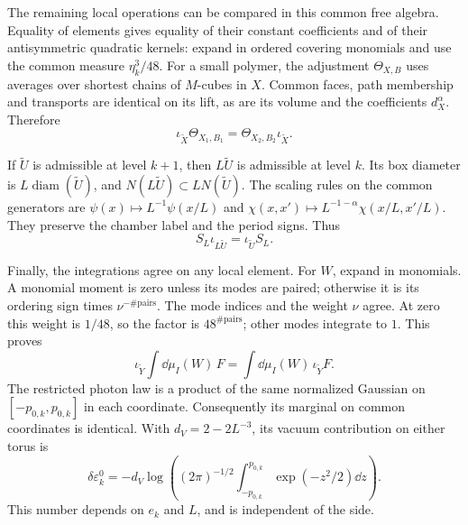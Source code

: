 The remaining local operations can be compared in
this common free algebra. Equality of elements gives
equality of their constant coefficients and of their
antisymmetric quadratic kernels: expand in ordered
covering monomials and use the common measure
$\eta_k^3/48$. For a small polymer, the adjustment
$\Theta_{X,B}$ uses averages over shortest chains
of $M$-cubes in $X$. Common faces, path membership
and transports are identical on its lift, as are
its volume and the coefficients $d_X^\alpha$.
Therefore
\begin{equation}\label{eq:rgcov-adjustment-intertwining}
 \iota_{\widetilde X}\Theta_{X_1,B_1}
                      =\Theta_{X_2,B_2}\iota_{\widetilde X}.
\end{equation}

If $\widetilde U$ is admissible at level $k+1$,
then $L\widetilde U$ is admissible at level $k$.
Its box diameter is $L\operatorname{diam}(\widetilde U)$,
and $N(L\widetilde U)\subset L N(\widetilde U)$.
The scaling rules on the common generators are
$\psi(x)\mapsto L^{-1}\psi(x/L)$ and
$\chi(x,x')\mapsto L^{-1-\alpha}\chi(x/L,x'/L)$.
They preserve the chamber label and the period signs.
Thus
\begin{equation}\label{eq:rgcov-scaling-intertwining}
 S_L\iota_{L\widetilde U}=\iota_{\widetilde U}S_L.
\end{equation}

Finally, the integrations agree on any local element.
For $W$, expand in monomials. A monomial moment is
zero unless its modes are paired; otherwise it is
its ordering sign times $\nu^{-\#\mathrm{pairs}}$.
The mode indices and the weight $\nu$ agree.
At zero this weight is $1/48$, so the factor is
$48^{\#\mathrm{pairs}}$; other modes integrate to $1$.
This proves
\begin{equation}\label{eq:rgcov-W-integration}
 \iota_{\widetilde Y}\int\dd\mu_I(W)\,F
                    =\int\dd\mu_I(W)\,\iota_{\widetilde Y}F.
\end{equation}
The restricted photon law is a product of the same
normalized Gaussian on $[-p_{0,k},p_{0,k}]$ in each
coordinate. Consequently its marginal on common
coordinates is identical. With $d_V=2-2L^{-3}$,
its vacuum contribution on either torus is
\begin{equation}\label{eq:rgcov-box-vacuum}
 \delta\varepsilon_k^0
 =-d_V\log\left((2\pi)^{-1/2}
             \int_{-p_{0,k}}^{p_{0,k}}\exp(-z^2/2)\dd z\right).
\end{equation}
This number depends on $e_k$ and $L$, and is independent
of the side.

